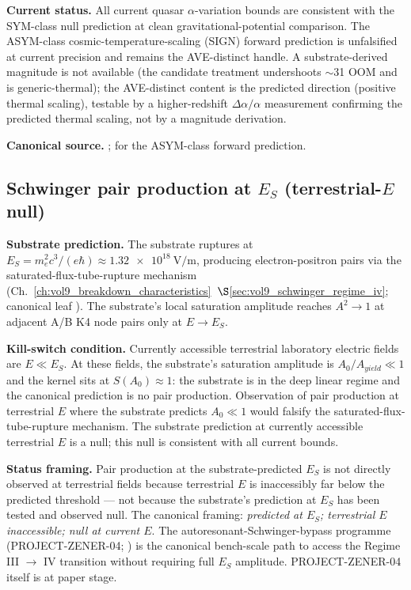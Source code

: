 \textbf{Current status.} All current quasar $\alpha$-variation bounds are consistent with the SYM-class null prediction at clean gravitational-potential comparison. The ASYM-class cosmic-temperature-scaling (SIGN) forward prediction is unfalsified at current precision and remains the AVE-distinct handle. A substrate-derived magnitude is not available (the candidate treatment undershoots $\sim$31 OOM and is generic-thermal); the AVE-distinct content is the predicted direction (positive thermal scaling), testable by a higher-redshift $\Delta\alpha/\alpha$ measurement confirming the predicted thermal scaling, not by a magnitude derivation.

\textbf{Canonical source.} ;  for the ASYM-class forward prediction.

\subsection{Schwinger pair production at $E_S$ (terrestrial-$E$ null)}
\label{subsec:vol9_schwinger_terrestrial_null}

\textbf{Substrate prediction.} The substrate ruptures at $E_S = m_e^2 c^3/(e\hbar) \approx \qty{1.32e18}{\volt\per\metre}$, producing electron-positron pairs via the saturated-flux-tube-rupture mechanism (Ch.~\ref{ch:vol9_breakdown_characteristics}~$\S$\ref{sec:vol9_schwinger_regime_iv}; canonical leaf ). The substrate's local saturation amplitude reaches $A^2 \to 1$ at adjacent A/B K4 node pairs only at $E \to E_S$.

\textbf{Kill-switch condition.} Currently accessible terrestrial laboratory electric fields are $E \ll E_S$. At these fields, the substrate's saturation amplitude is $A_0/A_{yield} \ll 1$ and the kernel sits at $S(A_0) \approx 1$: the substrate is in the deep linear regime and the canonical prediction is no pair production. Observation of pair production at terrestrial $E$ where the substrate predicts $A_0 \ll 1$ would falsify the saturated-flux-tube-rupture mechanism. The substrate prediction at currently accessible terrestrial $E$ is a null; this null is consistent with all current bounds.

\textbf{Status framing.} Pair production at the substrate-predicted $E_S$ is not directly observed at terrestrial fields because terrestrial $E$ is inaccessibly far below the predicted threshold --- not because the substrate's prediction at $E_S$ has been tested and observed null. The canonical framing: \emph{predicted at $E_S$; terrestrial $E$ inaccessible; null at current $E$}. The autoresonant-Schwinger-bypass programme (PROJECT-ZENER-04; ) is the canonical bench-scale path to access the Regime III $\to$ IV transition without requiring full $E_S$ amplitude. PROJECT-ZENER-04 itself is at paper stage.

